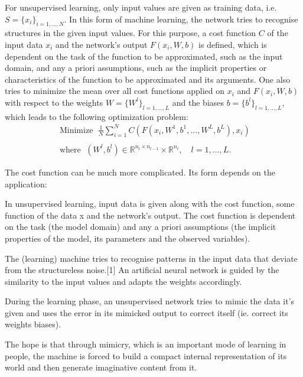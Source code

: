 For unsupervised learning, only input values are given as training data, i.e. $S = \{ x_i \}_{i = 1, \ldots, N}$. In this form of machine learning, the network tries to recognise structures in the given input values. For this purpose, a cost function $C$ of the input data $x_i$ and the network's output $F(x_i, W, b)$ is defined, which is dependent on the task of the function to be approximated, such as the input domain, and any a priori assumptions, such as the implicit properties or characteristics of the function to be approximated and its arguments. One also tries to minimize the mean over all cost functions applied on $x_i$ and $F(x_i, W, b)$ with respect to the weights $W = \{ W^l \}_{l = 1, \ldots, L}$ and the biases $b = \{ b^l \}_{l = 1, \ldots, L}$, which leads to the following optimization problem:
\begin{equation*}
    \begin{gathered}
        \text{ Minimize } \; \frac{1}{N} \sum_{i=1}^{N}  C \left( F \left( x_{i}, W^{1}, b^{1}, \ldots, W^{L}, b^{L}\right), x_i \right) \\
        \\
        \text{ where } \; \left(W^{l}, b^{l}\right) \in \mathbb{R}^{n_l \times n_{l-1}} \times \mathbb{R}^{n_l}, \quad l=1, \ldots, L .
    \end{gathered}
\end{equation*}


The cost function can be much more complicated. Its form depends on the application:



In unsupervised learning, input data is given along with the cost function, some function of the data x and the network's output. The cost function is dependent on the task (the model domain) and any a priori assumptions (the implicit properties of the model, its parameters and the observed variables).


The (learning) machine tries to recognise patterns in the input data that deviate from the structureless noise.[1] An artificial neural network is guided by the similarity to the input values and adapts the weights accordingly.

During the learning phase, an unsupervised network tries to mimic the data it's given and uses the error in its mimicked output to correct itself (ie. correct its weights  biases).

The hope is that through mimicry, which is an important mode of learning in people, the machine is forced to build a compact internal representation of its world and then generate imaginative content from it.


